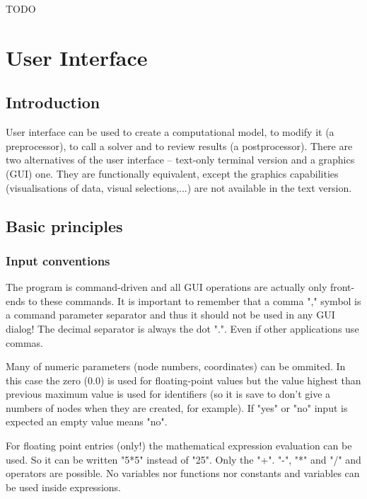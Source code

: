 \documentclass{article}
\begin{document}
 TODO



\section{User Interface}

\subsection{Introduction	}

 User interface can be used to create a computational model,
 to modify it (a preprocessor), to call a solver
 and to review results (a postprocessor).
 There are two alternatives of the user interface -- text-only
 terminal version and a graphics (GUI) one. They are functionally
 equivalent, except the graphics capabilities (visualisations of
 data, visual selections,...) are not available in the text
 version.



\subsection{Basic principles}

\subsubsection{Input conventions}

 The program is command-driven and all GUI operations are
 actually only front-ends to these commands. It is important
 to remember that a comma "," symbol is a command parameter
 separator and thus it should not be used in any GUI dialog!
 The decimal separator is always the dot ".". Even if other
 applications use commas.

 Many of numeric parameters (node numbers, coordinates) can
 be ommited. In this case the zero (0.0) is used
 for floating-point values but the value highest than previous
 maximum value is used for identifiers (so it is save to don't
 give a numbers of nodes when they are created, for example).
 If "yes" or "no" input is expected an empty value means "no". 

 For floating point entries (only!) the mathematical
 expression evaluation can be used. So it can be written
 "5*5" instead of "25". Only the "+". "-", "*" and "/" and 
  operators are possible. No variables nor functions
 nor constants and variables can be used inside expressions.
\end{document}
